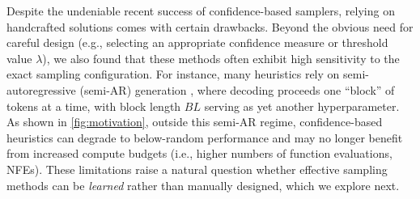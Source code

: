 Despite the undeniable recent success of confidence-based samplers, relying on handcrafted solutions comes with certain drawbacks. Beyond the obvious need for careful design (e.g., selecting an appropriate confidence measure or threshold value $\lambda$), we also found that these methods often exhibit high sensitivity to the exact sampling configuration. For instance, many heuristics rely on semi-autoregressive (semi-AR) generation \citep{arriola2025block,llada2025}, where decoding proceeds one ``block'' of tokens at a time, with block length $BL$ serving as yet another hyperparameter. As shown in \autoref{fig:motivation}, outside this semi-AR regime, confidence-based heuristics can degrade to below-random performance and may no longer benefit from increased compute budgets (i.e., higher numbers of function evaluations, NFEs). These limitations raise a natural question whether effective sampling methods can be \textit{learned} rather than manually designed, which we explore next.



